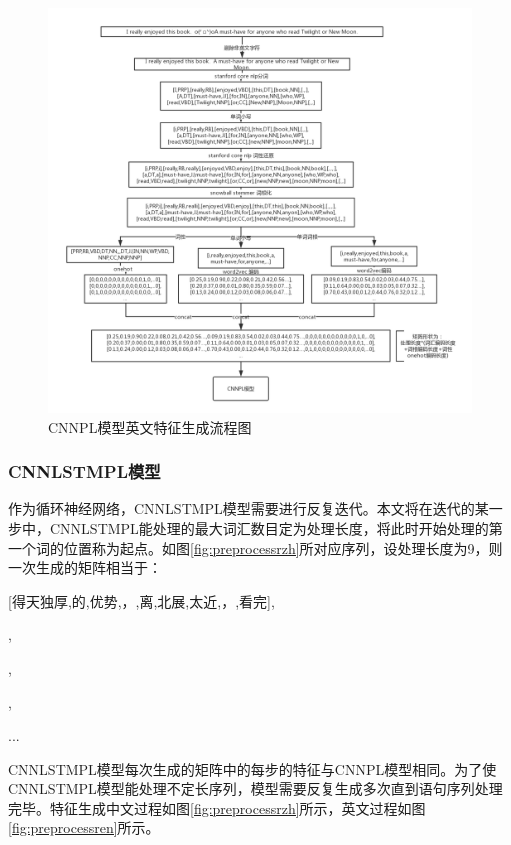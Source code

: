 \begin{figure}[!htbp]
\begin{center}
\includegraphics[width=\textwidth]{graphic/preprocesscen.png}
\caption{CNNPL模型英文特征生成流程图 \label{fig:preprocesscen}}
\end{center}
\end{figure}

\subsubsection{CNNLSTMPL模型}
作为循环神经网络，CNNLSTMPL模型需要进行反复迭代。本文将在迭代的某一步中，CNNLSTMPL能处理的最大词汇数目定为处理长度，将此时开始处理的第一个词的位置称为起点。如图\ref{fig:preprocessrzh}所对应序列，设处理长度为9，则一次生成的矩阵相当于：

[得天独厚,的,优势,，,离,北展,太近,，,看完],\par
[的,优势,，,离,北展,太近,，,看完,演出],\par
[优势,，,离,北展,太近,，,看完,演出,，],\par
[，,离,北展,太近,，,看完,演出,，,花],\par
...

CNNLSTMPL模型每次生成的矩阵中的每步的特征与CNNPL模型相同。为了使CNNLSTMPL模型能处理不定长序列，模型需要反复生成多次直到语句序列处理完毕。特征生成中文过程如图\ref{fig:preprocessrzh}所示，英文过程如图\ref{fig:preprocessren}所示。


